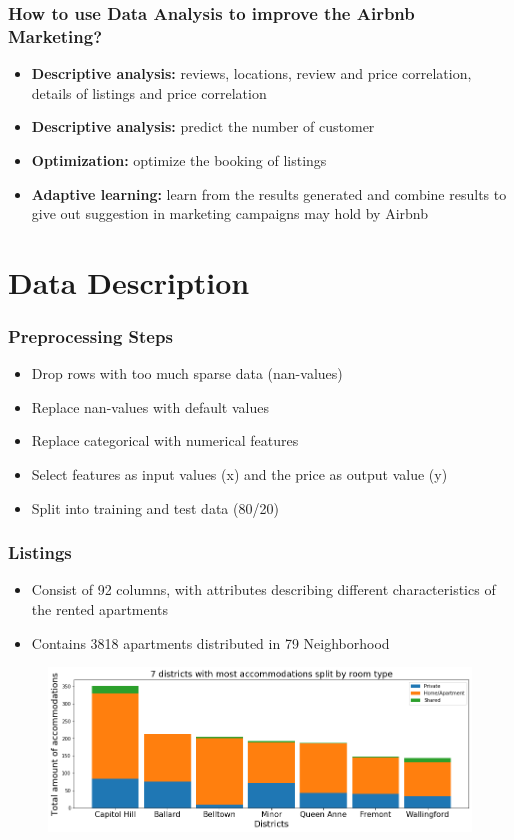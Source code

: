\documentclass{beamer}
\begin{document}

\begin{frame}
\frametitle{How to use Data Analysis to improve the Airbnb Marketing?}
\begin{itemize}
\item \textbf{Descriptive analysis:} reviews, locations, review and price correlation, details of listings and price correlation
\item \textbf{Descriptive analysis:} predict the number of customer
\item \textbf{Optimization:} optimize the booking of listings 
\item \textbf{Adaptive learning:} learn from the results generated and combine results to give out suggestion in marketing campaigns may hold by Airbnb
\end{itemize}
\end{frame}

\section{Data Description}

\begin{frame}
\frametitle{Preprocessing Steps}
\begin{itemize}
\item Drop rows with too much sparse data (nan-values)
\item Replace nan-values with default values
\item Replace categorical with numerical features
\item Select features as input values (x) and the price as output value (y)
\item Split into training and test data (80/20)
\end{itemize}
\end{frame}



\begin{frame}
\frametitle{Listings}
\begin{itemize}
\item Consist of 92 columns, with attributes describing different characteristics of the rented apartments
\item Contains 3818 apartments distributed in 79 Neighborhood
\end{itemize}
\begin{figure}
\includegraphics[width=0.8\linewidth]{photo/4_most_acc_split_by_roomtype}
\end{figure}
\end{frame}
\end{document}
